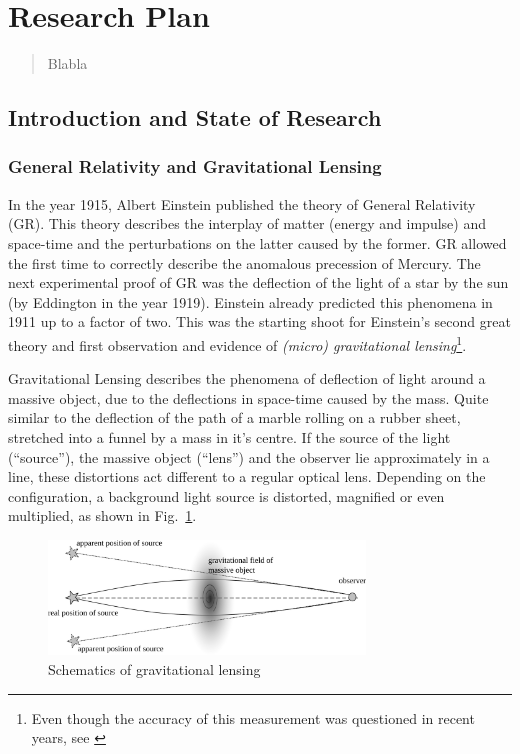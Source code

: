 \documentclass[11pt]{article}
\begin{document}
\newpage

\section*{Research Plan}

\begin{abstract}
Blabla
\end{abstract}


\subsection{Introduction and State of Research}
\label{sec:intro}

\subsubsection{General Relativity and Gravitational Lensing}

In the year 1915, Albert Einstein published the theory of General Relativity (GR).
This theory describes the interplay of matter (energy and impulse) and space-time and the perturbations on the latter caused by the former.
GR allowed the first time to correctly describe the anomalous precession of Mercury.
The next experimental proof of GR was the deflection of the light of a star by the sun (by Eddington in the year 1919).
Einstein already predicted this phenomena in 1911 up to a factor of two.
This was the starting shoot for Einstein’s second great theory and first observation and evidence of \emph{(micro) gravitational lensing}\footnote{Even though the accuracy of this measurement was questioned in recent years, see \cite{kennefick2009testing}}.

Gravitational Lensing describes the phenomena of deflection of light around a massive object, due to the deflections in space-time caused by the mass.
Quite similar to the deflection of the path of a marble rolling on a rubber sheet, stretched into a funnel by a mass in it's centre.
If the source of the light (``source''), the massive object (``lens'') and the observer lie approximately in a line, these distortions act different to a regular optical lens.
Depending on the configuration, a background light source is distorted, magnified or even multiplied, as shown in Fig.~\ref{fig:grav_lens}.

\begin{figure}[h]
	\centering
		\includegraphics[width=0.75\textwidth]{img/grav_lens}
	\caption{Schematics of gravitational lensing}
	\label{fig:grav_lens}
\end{figure}
\end{document}
